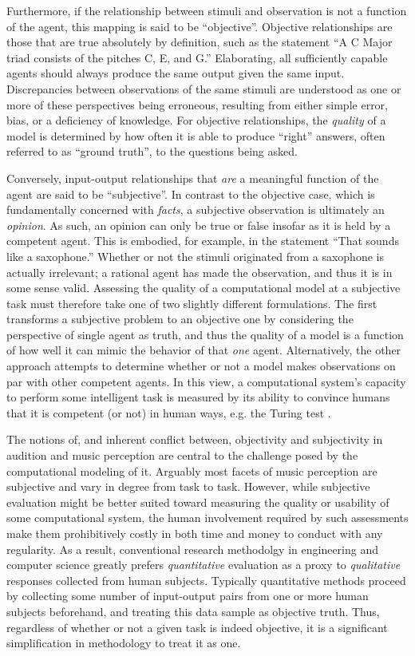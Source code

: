 Furthermore, if the relationship between stimuli and observation is not a function of the agent, this mapping is said to be ``objective''.
Objective relationships are those that are true absolutely by definition, such as the statement ``A C Major triad consists of the pitches C, E, and G.''
Elaborating, all sufficiently capable agents should always produce the same output given the same input.
Discrepancies between observations of the same stimuli are understood as one or more of these perspectives being erroneous, resulting from either simple error, bias, or a deficiency of knowledge.
For objective relationships, the \emph{quality} of a model is determined by how often it is able to produce ``right'' answers, often referred to as ``ground truth'', to the questions being asked.

Conversely, input-output relationships that \emph{are} a meaningful function of the agent are said to be ``subjective''.
In contrast to the objective case, which is fundamentally concerned with \emph{facts}, a subjective observation is ultimately an \emph{opinion}.
As such, an opinion can only be true or false insofar as it is held by a competent agent.
This is embodied, for example, in the statement ``That sounds like a saxophone.''
Whether or not the stimuli originated from a saxophone is actually irrelevant;
a rational agent has made the observation, and thus it is in some sense valid.
Assessing the quality of a computational model at a subjective task must therefore take one of two slightly different formulations.
The first transforms a subjective problem to an objective one by considering the perspective of single agent as truth, and thus the quality of a model is a function of how well it can mimic the behavior of that \emph{one} agent.
Alternatively, the other approach attempts to determine whether or not a model makes observations on par with other competent agents. %
In this view, a computational system's capacity to perform some intelligent task is measured by its ability to convince humans that it is competent (or not) in human ways, e.g. the Turing test \cite{Turing1950Computing}.

The notions of, and inherent conflict between, objectivity and subjectivity in audition and music perception are central to the challenge posed by the computational modeling of it.
Arguably most facets of music perception are subjective and vary in degree from task to task.
However, while subjective evaluation might be better suited toward measuring the quality or usability of some computational system, the human involvement required by such assessments make them prohibitively costly in both time and money to conduct with any regularity.
As a result, conventional research methodolgy in engineering and computer science greatly prefers \emph{quantitative} evaluation as a proxy to \emph{qualitative} responses collected from human subjects.
Typically quantitative methods proceed by collecting some number of input-output pairs from one or more human subjects beforehand, and treating this data sample as objective truth.
Thus, regardless of whether or not a given task is indeed objective, it is a significant simplification in methodology to treat it as one.

